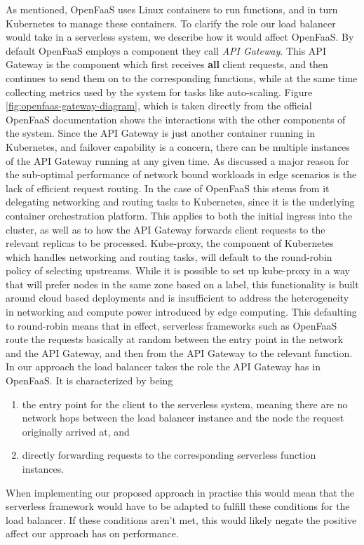 As mentioned, OpenFaaS uses Linux containers to run functions, and in turn Kubernetes to manage these containers. To clarify the role our load balancer would take in a serverless system, we describe how it would affect OpenFaaS. By default OpenFaaS employs a component they call \textit{API Gateway}. This API Gateway is the component which first receives \textbf{all} client requests, and then continues to send them on to the corresponding functions, while at the same time collecting metrics used by the system for tasks like auto-scaling. Figure \ref{fig:openfaas-gateway-diagram}, which is taken directly from the official OpenFaaS documentation shows the interactions with the other components of the system. Since the API Gateway is just another container running in Kubernetes\cite{kubernetes}, and failover capability is a concern, there can be multiple instances of the API Gateway running at any given time.
As discussed a major reason for the sub-optimal performance of network bound workloads in edge scenarios is the lack of efficient request routing.
In the case of OpenFaaS this stems from it delegating networking and routing tasks to Kubernetes, since it is the underlying container orchestration platform. This applies to both the initial ingress into the cluster, as well as to how the API Gateway forwards client requests to the relevant replicas to be processed. Kube-proxy, the component of Kubernetes which handles networking and routing tasks, will default to the round-robin policy of selecting upstreams. While it is possible to set up kube-proxy in a way that will prefer nodes in the same zone based on a label, this functionality is built around cloud based deployments and is insufficient to address the heterogeneity in networking and compute power introduced by edge computing. This defaulting to round-robin means that in effect, serverless frameworks such as OpenFaaS route the requests basically at random between the entry point in the network and the API Gateway, and then from the API Gateway to the relevant function.\\
In our approach the load balancer takes the role the API Gateway has in OpenFaaS. It is characterized by being
\begin{enumerate}
    \item the entry point for the client to the serverless system, meaning there are no network hops between the load balancer instance and the node the request originally arrived at, and
    \item directly forwarding requests to the corresponding serverless function instances.
\end{enumerate}
When implementing our proposed approach in practise this would mean that the serverless framework would have to be adapted to fulfill these conditions for the load balancer. If these conditions aren't met, this would likely negate the positive affect our approach has on performance.

